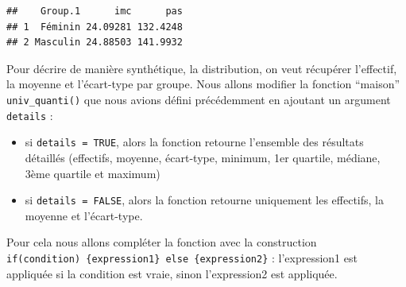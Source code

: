 \documentclass[
]{book}
\providecommand{\tightlist}{%
  \setlength{\itemsep}{0pt}\setlength{\parskip}{0pt}}
\begin{document}
\begin{verbatim}
##    Group.1      imc      pas
## 1  Féminin 24.09281 132.4248
## 2 Masculin 24.88503 141.9932
\end{verbatim}

Pour décrire de manière synthétique, la distribution, on veut récupérer l'effectif, la moyenne et l'écart-type par groupe. Nous allons modifier la fonction ``maison'' \texttt{univ\_quanti()} que nous avions défini précédemment en ajoutant un argument \texttt{details} :

\begin{itemize}
\tightlist
\item
  si \texttt{details\ =\ TRUE}, alors la fonction retourne l'ensemble des résultats détaillés (effectifs, moyenne, écart-type, minimum, 1er quartile, médiane, 3ème quartile et maximum)
\item
  si \texttt{details\ =\ FALSE}, alors la fonction retourne uniquement les effectifs, la moyenne et l'écart-type.
\end{itemize}

Pour cela nous allons compléter la fonction avec la construction \texttt{if(condition)\ \{expression1\}\ else\ \{expression2\}} : l'expression1 est appliquée si la condition est vraie, sinon l'expression2 est appliquée.
\end{document}
